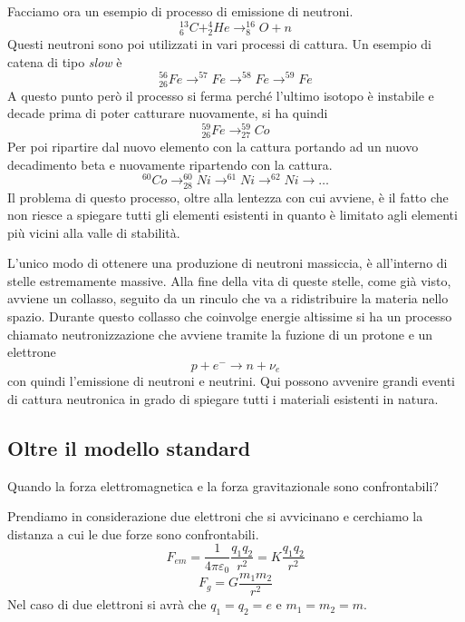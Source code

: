 Facciamo ora un esempio di processo di emissione di neutroni.
\begin{equation}
^{13}_6C+^4_2He\longrightarrow ^{16}_8O+n
\end{equation}
Questi neutroni sono poi utilizzati in vari processi di cattura.
Un esempio di catena di tipo \emph{slow} è
\begin{equation}
^{56}_{26}Fe\to ^{57}Fe\to ^{58}Fe\to ^{59}Fe
\end{equation}
A questo punto però il processo si ferma perché l'ultimo isotopo è instabile e decade prima di poter catturare nuovamente, si ha quindi 
\begin{equation}
^{59}_{26}Fe\to ^{59}_{27}Co
\end{equation}
Per poi ripartire dal nuovo elemento con la cattura portando ad un nuovo decadimento beta e nuovamente ripartendo con la cattura.
\begin{equation}
^{60}Co\to ^{60}_{28}Ni\to ^{61}Ni\to ^{62}Ni\to \dots
\end{equation}
Il problema di questo processo, oltre alla lentezza con cui avviene, è il fatto che non riesce a spiegare tutti gli elementi esistenti in quanto è limitato agli elementi più vicini alla valle di stabilità.

L'unico modo di ottenere una produzione di neutroni massiccia, è all'interno di stelle estremamente massive.
Alla fine della vita di queste stelle, come già visto, avviene un collasso, seguito da un rinculo che va a ridistribuire la materia nello spazio.
Durante questo collasso che coinvolge energie altissime si ha un processo chiamato neutronizzazione che avviene tramite la fuzione di un protone e un elettrone 
\begin{equation}
p+e^-\longrightarrow n+\nu_e
\end{equation}
con quindi l'emissione di neutroni e neutrini.
Qui possono avvenire grandi eventi di cattura neutronica in grado di spiegare tutti i materiali esistenti in natura.

\subsection{Oltre il modello standard}
Quando la forza elettromagnetica e la forza gravitazionale sono confrontabili?

Prendiamo in considerazione due elettroni che si avvicinano e cerchiamo la distanza a cui le due forze sono confrontabili.
\begin{equation}
F_{em}=\frac{1}{4\pi\varepsilon_0}\frac{q_1q_2}{r^2}=K\frac{q_1q_2}{r^2}
\end{equation}
\begin{equation}
F_g=G\frac{m_1m_2}{r^2}
\end{equation}
Nel caso di due elettroni si avrà che $q_1=q_2=e$ e $m_1=m_2=m$.

